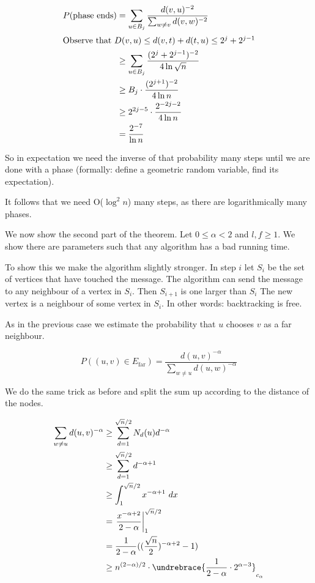 \begin{pr}
\begin{align*}
P(\text{phase ends}) &= \sum_{u\in B_j} \frac{d(v,u)^{-2}}{\sum_{w\neq v} d(v,w)^{-2}}\\
\intertext{Observe that $D(v,u) \leq d(v,t)+d(t,u) \leq 2^j+2^{j-1}$}
&\geq \sum_{u\in B_j} \frac{(2^j+2^{j-1})^{-2}}{4\ln \sqrt{n}}\\
&\geq B_j \cdot \frac{(2^{j+1})^{-2}}{4\ln n}\\
&\geq 2^{2j-5} \cdot \frac{2^{-2j-2}}{4\ln n}\\
&=\frac{2^{-7}}{\ln n}
\end{align*}

So in expectation we need the inverse of that probability many steps until we are done with a phase (formally: define a geometric random variable, find its expectation).

It follows that we need O($\log^2n$) many steps, as there are logarithmically many phases.

We now show the second part of the theorem. Let $0\leq \alpha < 2$ and $l,f\geq 1$. We show there are parameters such that any algorithm has a bad running time.

To show this we make the algorithm slightly stronger. In step $i$ let $S_i$ be the set of vertices that have touched the message. The algorithm can send the message to any neighbour of a vertex in $S_i$. Then $S_{i+1}$ is one larger than $S_i$ The new vertex is a neighbour of some vertex in $S_i$.  In other words: backtracking is free.

As in the previous case we estimate the probability that $u$ chooses $v$ as a far neighbour.

\[P((u,v)\in E_{\text{far}}) = \frac{d(u,v)^{-\alpha}}{\sum_{w\neq u}d(u,w)^{-\alpha}}\]

We do the same trick as before and split the sum up according to the distance of the nodes.

\begin{align*}
\sum_{w\neq u} d(u,v)^{-\alpha} &\geq \sum_{d=1}^{\sqrt{n}/2} N_d(u)d^{-\alpha}\\
	&\geq \sum_{d=1}^{\sqrt n/2} d^{-\alpha +1}\\
	&\geq \int_1^{\sqrt{n}/2} x^{-\alpha+1}\ dx\\
	&=\left. \frac{x^{-\alpha +2}}{2-\alpha}\right|_1^{\sqrt{n}/2}\\
	&=\frac{1}{2-\alpha} ((\frac{\sqrt n}{2})^{-\alpha +2} -1)\\
	&\geq n^{(2-\alpha)/2} \cdot \undrebrace{\frac{1}{2-\alpha} \cdot 2^{\alpha-3}}_{c_\alpha}
\end{align*}


\end{pr}

